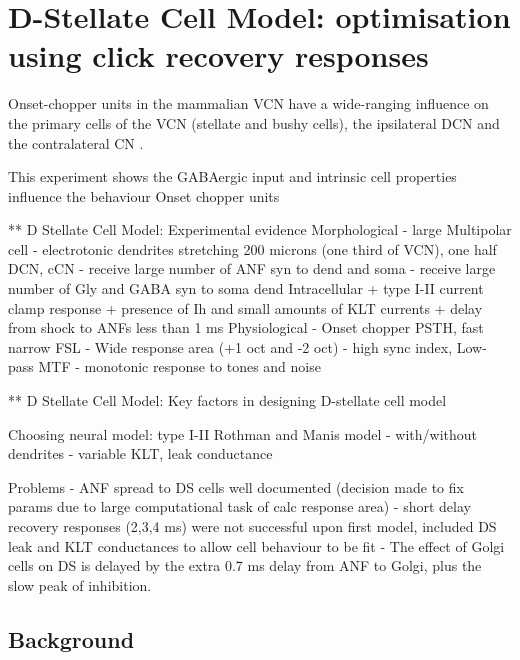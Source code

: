 
\graphicspath{{/media/data/Work/cnstellate/DS_ClickRecovery/}{/media/data/Work/Responses/}}
\section[DS Cell Model]{D-Stellate Cell Model: optimisation using click recovery responses}
\label{sec:d-stellate-cell-model}

Onset-chopper units in the mammalian VCN have a wide-ranging influence
on the primary cells of the VCN (stellate and bushy cells), the
ipsilateral DCN and the contralateral CN \citep{NeedhamPaolini:2007}.  

This experiment shows the GABAergic input and intrinsic
cell properties  influence the behaviour Onset chopper units


** D Stellate Cell Model:  Experimental evidence
Morphological 
  - large Multipolar cell
  - electrotonic dendrites stretching 200 microns (one third of VCN), one half DCN, cCN 
  - receive large number of ANF syn to dend and soma
  - receive large number of Gly and GABA syn to soma dend
Intracellular
  + type I-II current clamp response
  + presence of Ih and small amounts of KLT currents
  + delay from shock to ANFs less than 1 ms 
Physiological 
  - Onset chopper PSTH, fast narrow FSL 
  - Wide response area (+1 oct and -2 oct)
  - high sync index, Low-pass MTF
  - monotonic response to tones and noise 

** D Stellate Cell Model:  Key factors in designing D-stellate cell model

Choosing neural model: type I-II Rothman and Manis model
  - with/without dendrites
  - variable KLT, leak conductance

Problems
  - ANF spread to DS cells well documented (decision made to
    fix params due to large computational task of calc response area) 
  - short delay recovery responses (2,3,4 ms) were not successful upon
    first model, included DS leak and KLT conductances to allow cell
    behaviour to be fit
  - The effect of Golgi cells on DS is delayed by the extra 0.7 ms delay from ANF to Golgi, plus the slow peak of \GABAa inhibition.



\subsection{Background}

